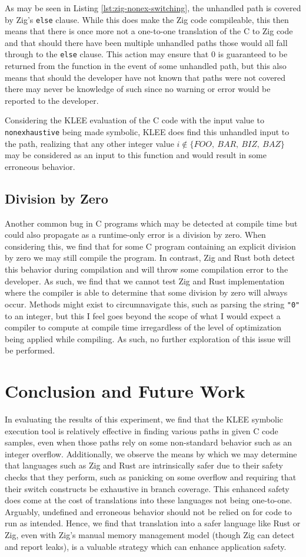 \documentclass[conference]{IEEEtran}
\begin{document}
As may be seen in Listing \ref{lst:zig-nonex-switching}, the unhandled path is covered by Zig's
\texttt{else} clause. While this does make the Zig code compileable, this then means that there
is once more not a one-to-one translation of the C to Zig code and that should there have been
multiple unhandled paths those would all fall through to the \texttt{else} clause. This action
may ensure that 0 is guaranteed to be returned from the function in the event of some unhandled
path, but this also means that should the developer have not known that paths were not covered
there may never be knowledge of such since no warning or error would be reported to the
developer.

Considering the KLEE evaluation of the C code with the input value to \texttt{nonexhaustive}
being made symbolic, KLEE does find this unhandled input to the path, realizing that any other
integer value $i\notin\{FOO,\ BAR,\ BIZ,\ BAZ\}$ may be considered as an input to this function
and would result in some erroneous behavior.


\subsection{Division by Zero}
Another common bug in C programs which may be detected at compile time but could also propagate
as a runtime-only error is a division by zero. When considering this, we find that for some C
program containing an explicit division by zero we may still compile the program. In contrast,
Zig and Rust both detect this behavior during compilation and will throw some compilation error
to the developer. As such, we find that we cannot test Zig and Rust implementation where the
compiler is able to determine that some division by zero will always occur. Methods might exist
to circumnavigate this, such as parsing the string \texttt{"0"} to an integer, but this I feel
goes beyond the scope of what I would expect a compiler to compute at compile time irregardless
of the level of optimization being applied while compiling. As such, no further exploration of
this issue will be performed.


\section{Conclusion and Future Work}
In evaluating the results of this experiment, we find that the KLEE symbolic
execution tool is relatively effective in finding various paths in given C
code samples, even when those paths rely on some non-standard behavior such
as an integer overflow. Additionally, we observe the means by which we may
determine that languages such as Zig and Rust are intrinsically safer due to
their safety checks that they perform, such as panicking on some overflow and
requiring that their switch constructs be exhaustive in branch coverage. This
enhanced safety does come at the cost of translations into these languages not
being one-to-one. Arguably, undefined and erroneous behavior should not be
relied on for code to run as intended. Hence, we find that translation into a
safer language like Rust or Zig, even with Zig's manual memory management
model (though Zig can detect and report leaks), is a valuable strategy which
can enhance application safety.
\end{document}
